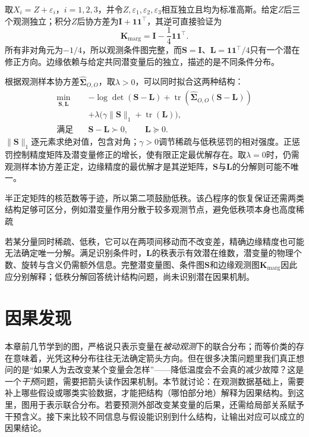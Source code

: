 取$X_i=Z+\varepsilon_i$，$i=1,2,3$，并令$Z,\varepsilon_1,\varepsilon_2,\varepsilon_3$相互独立且均为标准高斯。给定$Z$后三个观测独立；积分$Z$后协方差为$\bm{I}+\bm{1}\bm{1}^{\top}$，其逆可直接验证为
\[
  \bm{K}_{\mathrm{marg}}
  =\bm{I}-\frac14\bm{1}\bm{1}^{\top}.
\]
所有非对角元为$-1/4$，所以观测条件图完整，而$\bm{S}=\bm{I}$、$\bm{L}=\bm{1}\bm{1}^{\top}/4$只有一个潜在修正方向。边缘依赖与给定共同潜变量后的独立，描述的是不同条件分布。

根据观测样本协方差$\widehat{\bm{\Sigma}}_{O,O}$，取$\lambda>0$，可以同时拟合这两种结构：
\begin{equation}
  \begin{aligned}
    \min_{\bm{S},\bm{L}}\quad&
      -\log\det(\bm{S}-\bm{L})
      +\operatorname{tr}\!\left(
           \widehat{\bm{\Sigma}}_{O,O}(\bm{S}-\bm{L})\right)\\
      &+\lambda\bigl(\gamma\lVert\bm{S}\rVert_1
                      +\operatorname{tr}(\bm{L})\bigr),\\
    \text{满足}\quad&\bm{S}-\bm{L}\succ0,\qquad \bm{L}\succeq0.
  \end{aligned}
  \label{eq:pgm-structure-learning-sparse-low-rank}
\end{equation}
$\lVert\bm{S}\rVert_1$逐元素求绝对值，包含对角；$\gamma>0$调节稀疏与低秩惩罚的相对强度。正惩罚控制精度矩阵及潜变量修正的增长，使有限正定最优解存在。取$\lambda=0$时，仍需观测样本协方差正定，边缘精度的最优解才是其逆矩阵，$\bm S$与$\bm L$的分解则可能不唯一。

半正定矩阵的核范数等于迹，所以第二项鼓励低秩。该凸程序的恢复保证还需两类结构足够可区分，例如潜变量作用分散于较多观测节点，避免低秩项本身也高度稀疏

若某分量同时稀疏、低秩，它可以在两项间移动而不改变差，精确边缘精度也可能无法确定唯一分解。满足识别条件时，$\bm{L}$的秩表示有效潜在维数，潜变量的物理个数、旋转与含义仍需额外信息。完整潜变量图、条件图$\bm{S}$和边缘观测图$\bm{K}_{\mathrm{marg}}$因此应分别解释；低秩分解回答统计结构问题，尚未识别潜在因果机制。

\section{因果发现}
\label{sec:pgm-structure-learning-causal}

本章前几节学到的图，严格说只表示变量在\emph{被动观测}下的联合分布；而等价类的存在意味着，光凭这种分布往往无法确定箭头方向。但在很多决策问题里我们真正想问的是“如果人为去改变某个变量会怎样”——降低温度会不会真的减少故障？这是一个\emph{干预}问题，需要把箭头读作因果机制。本节就讨论：在观测数据基础上，需要补上哪些假设或哪类实验数据，才能把结构（哪怕部分地）解释为因果结构。到这里，图用于表示联合分布。若要预测外部改变某变量的后果，还需给局部关系赋予干预含义。接下来比较不同信息与假设能识别到什么结构，让输出对应可以成立的因果结论。

